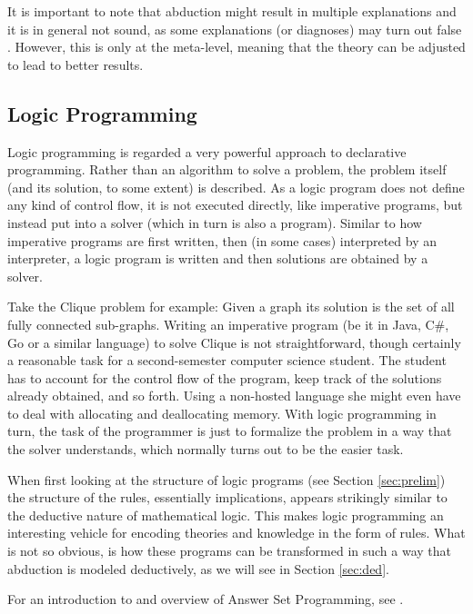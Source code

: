 \documentclass[a4paper]{article}
\begin{document}
It is important to note that abduction might result in multiple explanations and it is in general not sound, as some explanations (or diagnoses) may turn out false \cite{DBLP:journals/tcs/EiterGL97}. However, this is only at the meta-level, meaning that the theory can be adjusted to lead to better results.

\subsection{Logic Programming}
\label{sec:logprog}

Logic programming is regarded a very powerful approach to declarative programming. Rather than an algorithm to solve a problem, the problem itself (and its solution, to some extent) is described. As a logic program does not define any kind of control flow, it is not executed directly, like imperative programs, but instead put into a solver (which in turn is also a program). Similar to how imperative programs are first written, then (in some cases) interpreted by an interpreter, a logic program is written and then solutions are obtained by a solver.

Take the Clique problem for example: Given a graph its solution is the set of all fully connected sub-graphs. Writing an imperative program (be it in Java, C\#, Go or a similar language) to solve Clique is not straightforward, though certainly a reasonable task for a second-semester computer science student. The student has to account for the control flow of the program, keep track of the solutions already obtained, and so forth. Using a non-hosted language she might even have to deal with allocating and deallocating memory. With logic programming in turn, the task of the programmer is just to formalize the problem in a way that the solver understands, which normally turns out to be the easier task.

When first looking at the structure of logic programs (see Section \ref{sec:prelim}) the structure of the rules, essentially implications, appears strikingly similar to the deductive nature of mathematical logic. This makes logic programming an interesting vehicle for encoding theories and knowledge in the form of rules. What is not so obvious, is how these programs can be transformed in such a way that abduction is modeled deductively, as we will see in Section \ref{sec:ded}.

For an introduction to and overview of Answer Set Programming, see \cite{DBLP:conf/rweb/EiterIK09}.
\end{document}
